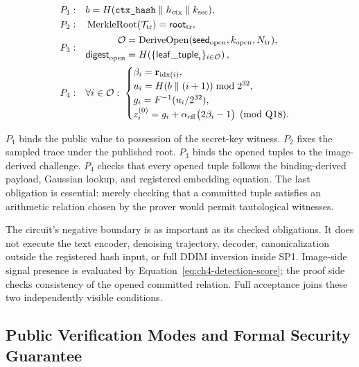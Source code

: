 \begin{align}
P_1:
    &\quad
    b
      =H(\texttt{ctx\_hash}\parallel h_{\mathrm{ctx}}\parallel k_{\mathrm{sec}}),
\label{eq:ch4-predicate-p1}\\
P_2:
    &\quad
    \operatorname{MerkleRoot}(\mathcal{T}_{\mathrm{tr}})
      =\mathsf{root}_{\mathrm{tr}},
\label{eq:ch4-predicate-p2}\\
P_3:
    &\quad
    \begin{aligned}
    \mathcal{O}
       &=\operatorname{DeriveOpen}
         (\mathsf{seed}_{\mathrm{open}},k_{\mathrm{open}},N_{\mathrm{tr}}),\\
    \mathsf{digest}_{\mathrm{open}}
       &=H\!\left(
           \{\mathsf{leaf\_tuple}_i\}_{i\in\mathcal{O}}
         \right),
    \end{aligned}
\label{eq:ch4-predicate-p3}\\
P_4:
    &\quad
    \forall i\in\mathcal{O}:\;
    \begin{cases}
       \beta_i=\mathbf r_{\operatorname{idx}(i)},\\
       u_i=H(b\parallel(i+1))\bmod2^{32},\\
       g_i=F^{-1}(u_i/2^{32}),\\
       z_i^{(0)}
          =g_i+\alpha_{\mathrm{eff}}
             \bigl(2\beta_i-1\bigr)
             \pmod{\mathrm{Q18}}.
    \end{cases}
\label{eq:ch4-predicate-p4}
\end{align}

$P_1$ binds the public value to possession of the secret-key witness.  $P_2$
fixes the sampled trace under the published root.  $P_3$ binds the opened tuples
to the image-derived challenge.  $P_4$ checks that every opened tuple follows
the binding-derived payload, Gaussian lookup, and registered embedding equation.
The last obligation is essential: merely checking that a committed tuple satisfies
an arithmetic relation chosen by the prover would permit tautological witnesses.

The circuit's negative boundary is as important as its checked obligations.  It
does not execute the text encoder, denoising trajectory, decoder, canonicalization
outside the registered hash input, or full DDIM inversion inside SP1.  Image-side
signal presence is evaluated by Equation~\eqref{eq:ch4-detection-score}; the proof
side checks consistency of the opened committed relation.  Full acceptance joins
these two independently visible conditions.

\subsection{Public Verification Modes and Formal Security Guarantee}
\label{subsec:ch4-verification-security}

